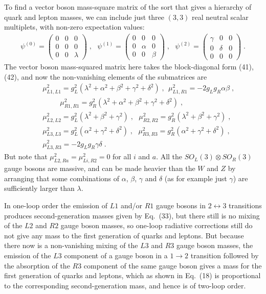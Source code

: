 To find a vector boson mass-square matrix of the sort that gives a hierarchy of quark and lepton masses, we can include  just three $(3,3)$ real neutral scalar multiplets, with non-zero expectation values:
\begin{eqnarray}
\psi^{(0)}=\left(\begin{array}{ccc}0 & 0 & 0 \\ 0 & 0 & 0 \\ 0 & 0 & \lambda\end{array}\right)\;,~~~
\psi^{(1)}=\left(\begin{array}{ccc}0 & 0 & 0 \\ 0 & \alpha & 0 \\ 0 & 0 & \beta\end{array}\right)\;,~~~
\psi^{(2)}=\left(\begin{array}{ccc}\gamma & 0 & 0 \\ 0 & \delta & 0 \\ 0 & 0 & 0\end{array}\right)\;.
\end{eqnarray}
  The vector boson mass-squared matrix here takes the block-diagonal form (41), (42), and now the non-vanishing elements of the submatrices are
\begin{eqnarray}
&&\mu_{L1,L1}^2=g_L^2(\lambda^2+\alpha^2+\beta^2+\gamma^2+\delta^2)\;,~~\mu_{L1,R1}^2=-2g_Lg_R\alpha\beta\;,\nonumber\\&&~~~~~~~~~~~\mu_{R1,R1}^2=g_R^2(\lambda^2+\alpha^2+\beta^2+\gamma^2+\delta^2)\;,\nonumber\\&&
\mu^2_{L2,L2}=g_L^2(\lambda^2+\beta^2+\gamma^2)\;,~~~\mu^2_{R2,R2}=g_R^2(\lambda^2+\beta^2+\gamma^2)\;,	\nonumber\\&&
\mu^2_{L3,L3}=g_L^2(\alpha^2+\gamma^2+\delta^2)\;,~~~\mu^2_{R3,R3}=g_R^2(\alpha^2+\gamma^2+\delta^2)\;,\nonumber\\&&
\mu^2_{L3,R3}=-2g_Lg_R\gamma\delta\;.
\end{eqnarray}
But note that $\mu^2_{L2,Ra}=\mu^2_{Li,R2}=0$ for all $i$  and $a$.
All the $SO_L(3)\otimes  SO_R(3)$ gauge bosons are massive, and can be made heavier than the $W$ and $Z$ by arranging that some combinations of $\alpha$, $\beta$, $\gamma$ and
$\delta$ (as for example just $\gamma$) are sufficiently larger than $\lambda$.  

 In one-loop order the emission of $L1$ and/or $R1$ gauge bosons in $2\leftrightarrow 3$ transitions produces second-generation masses given by Eq.~(33), but there still is no  mixing of the $L2$ and $R2$ gauge boson masses, so  one-loop radiative corrections  still do not give any  mass to the first  generation of quarks and leptons.  But because there now is a non-vanishing mixing of the $L3$ and $R3$ gauge boson masses, the emission of the  $L3$ component of a gauge boson in a $1\rightarrow 2$ transition followed by the absorption of the $R3$ component of the same gauge boson gives a mass for the first generation of quarks and leptons, which as shown in Eq.~(18) is proportional to the corresponding second-generation mass, and hence is of two-loop order.  



